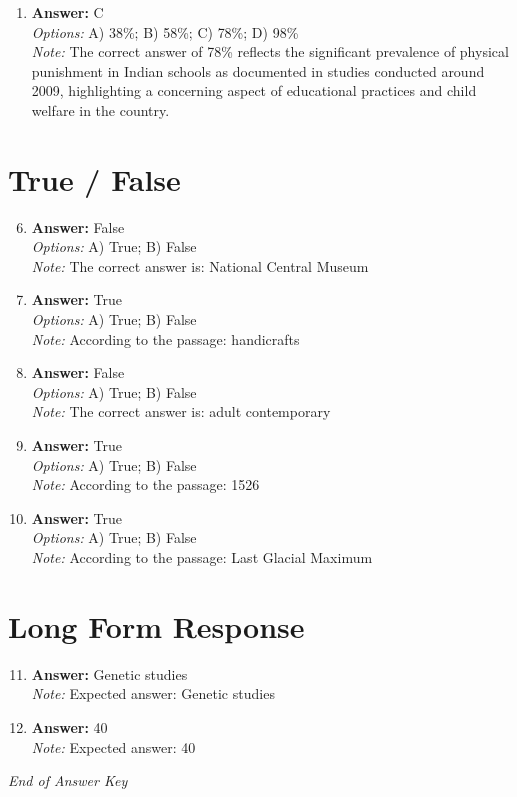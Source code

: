 \documentclass[12pt]{article}
\begin{document}
\begin{enumerate}[label=\arabic*.]
\item \textbf{Answer:} C
\\ \textit{Options:} A) 38\%; B) 58\%; C) 78\%; D) 98\%
\\ \textit{Note:} The correct answer of 78\% reflects the significant prevalence of physical punishment in Indian schools as documented in studies conducted around 2009, highlighting a concerning aspect of educational practices and child welfare in the country.
\end{enumerate}

\section*{True / False}
\begin{enumerate}[label=\arabic*.]
\setcounter{enumi}{5}
\item \textbf{Answer:} False
\\ \textit{Options:} A) True; B) False
\\ \textit{Note:} The correct answer is: National Central Museum
\item \textbf{Answer:} True
\\ \textit{Options:} A) True; B) False
\\ \textit{Note:} According to the passage: handicrafts
\item \textbf{Answer:} False
\\ \textit{Options:} A) True; B) False
\\ \textit{Note:} The correct answer is: adult contemporary
\item \textbf{Answer:} True
\\ \textit{Options:} A) True; B) False
\\ \textit{Note:} According to the passage: 1526
\item \textbf{Answer:} True
\\ \textit{Options:} A) True; B) False
\\ \textit{Note:} According to the passage: Last Glacial Maximum
\end{enumerate}

\section*{Long Form Response}
\begin{enumerate}[label=\arabic*.]
\setcounter{enumi}{10}
\item \textbf{Answer:} Genetic studies
\\ \textit{Note:} Expected answer: Genetic studies
\item \textbf{Answer:} 40
\\ \textit{Note:} Expected answer: 40
\end{enumerate}

\vfill
\noindent\textit{End of Answer Key}
\end{document}
